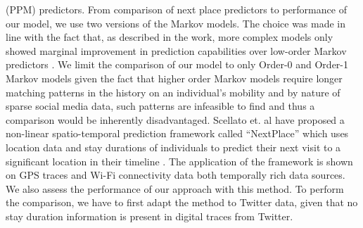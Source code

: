 (PPM) predictors. From comparison of next place predictors to performance of our model, we use two versions of the Markov models. The choice was made in line with the fact that, as described in the work, more complex models only showed marginal improvement in prediction capabilities over low-order Markov predictors \cite{134}. We limit the comparison of our model to only Order-0 and Order-1 Markov models given the fact that higher order Markov models require longer matching patterns in the history on an individual's mobility and by nature of sparse social media data, such patterns are infeasible to find and thus a comparison would be inherently disadvantaged. Scellato et. al have proposed a non-linear spatio-temporal prediction framework called “NextPlace” which uses location data and stay durations of individuals to predict their next visit to a significant location in their timeline \cite{136}. The application of the framework is shown on GPS traces and Wi-Fi connectivity data both temporally rich data sources. We also assess the performance of our approach with this method. To perform the comparison, we have to first adapt the method to Twitter data, given that no stay duration information is present in digital traces from Twitter.


